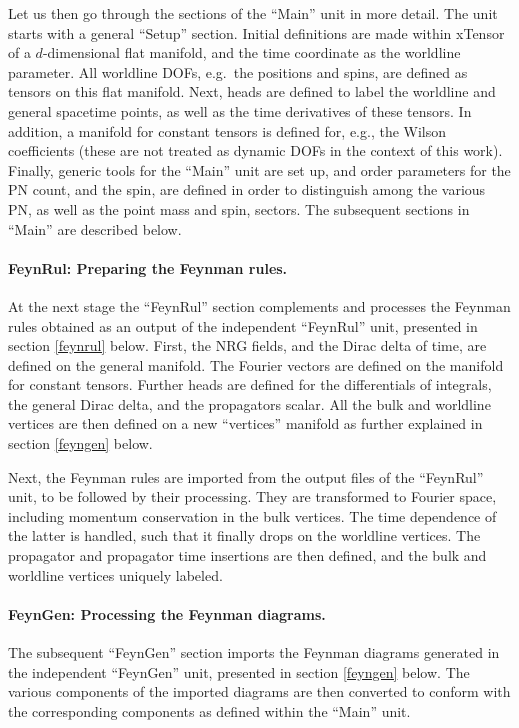 \documentclass[a4paper,11pt]{article}
\begin{document}
Let us then go through the sections of the ``Main'' unit in more detail.
The unit starts with a general ``Setup'' section. Initial definitions are made within 
xTensor of a $d$-dimensional flat manifold, and the time coordinate as the worldline 
parameter. All worldline DOFs, e.g.~the positions and spins, are defined as tensors on this 
flat manifold. Next, heads are defined to label the worldline and general spacetime points, 
as well as the time derivatives of these tensors. In addition, a manifold for constant 
tensors is defined for, e.g., the Wilson coefficients (these are not treated as dynamic DOFs 
in the context of this work). Finally, generic tools for the ``Main'' unit are set up, and 
order parameters for the PN count, and the spin, are defined in order to distinguish among 
the various PN, as well as the point mass and spin, sectors. The subsequent sections in 
``Main'' are described below.
 
\paragraph{FeynRul: Preparing the Feynman rules.}

At the next stage the ``FeynRul'' section complements and processes the Feynman rules 
obtained as an output of the independent ``FeynRul'' unit, presented in section 
\ref{feynrul} below. First, the NRG fields, and the Dirac delta of time, are defined on the 
general manifold. The Fourier vectors are defined on the manifold for constant tensors. 
Further heads are defined for the differentials of integrals, the general Dirac delta, and 
the propagators scalar. All the bulk and worldline vertices are then defined on a new 
``vertices'' manifold as further explained in section \ref{feyngen} below. 

Next, the Feynman rules are imported from the output files of the ``FeynRul'' unit, to be 
followed by their processing. They are transformed to Fourier space, including momentum 
conservation in the bulk vertices. The time dependence of the latter is handled, such that 
it finally drops on the worldline vertices. The propagator and propagator time insertions 
are then defined, and the bulk and worldline vertices uniquely labeled.

\paragraph{FeynGen: Processing the Feynman diagrams.}

The subsequent ``FeynGen'' section imports the Feynman diagrams generated in the  
independent ``FeynGen'' unit, presented in section \ref{feyngen} below. The various 
components of the imported diagrams are then converted to conform with the corresponding  
components as defined within the ``Main'' unit.
\end{document}
